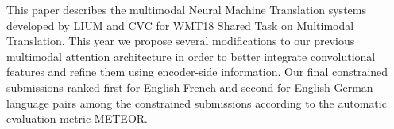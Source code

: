 This paper describes the multimodal Neural Machine Translation systems developed by LIUM and CVC for WMT18 Shared Task on Multimodal Translation. This year we propose several modifications to our previous multimodal attention architecture in order to better integrate convolutional features and refine them using encoder-side information. Our final constrained submissions ranked first for English-French and second for English-German language pairs among the constrained submissions according to the automatic evaluation metric METEOR.
